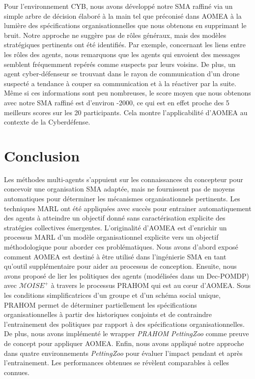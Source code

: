 Pour l'environnement CYB, nous avons développé notre SMA raffiné via un simple arbre de décision élaboré à la main tel que préconisé dans AOMEA à la lumière des spécifications organisationnelles que nous obtenons en supprimant le bruit. Notre approche ne suggère pas de rôles généraux, mais des modèles stratégiques pertinents ont été identifiés. Par exemple, concernant les liens entre les rôles des agents, nous remarquons que les agents qui envoient des messages semblent fréquemment repérés comme suspects par leurs voisins. De plus, un agent cyber-défenseur se trouvant dans le rayon de communication d'un drone suspecté a tendance à couper sa communication et à la réactiver par la suite. Même si ces informations sont peu nombreuses, le score moyen que nous obtenons avec notre SMA raffiné est d'environ -2000, ce qui est en effet proche des 5 meilleurs scores sur les 20 participants. Cela montre l'applicabilité d'AOMEA au contexte de la Cyberdéfense.

\section{Conclusion}

Les méthodes multi-agents s'appuient sur les connaissances du concepteur pour concevoir une organisation SMA adaptée, mais ne fournissent pas de moyens automatiques pour déterminer les mécanismes organisationnels pertinents.
Les techniques MARL ont été appliquées avec succès pour entrainer automatiquement des agents à atteindre un objectif donné sans caractérisation explicite des stratégies collectives émergentes.
L'originalité d'AOMEA est d'enrichir un processus MARL d'un modèle organisationnel explicite vers un objectif méthodologique pour aborder ces problématiques. Nous avons d'abord exposé comment AOMEA est destiné à être utilisé dans l'ingénierie SMA en tant qu'outil supplémentaire pour aider au processus de conception.
Ensuite, nous avons proposé de lier les politiques des agents (modélisées dans un Dec-POMDP) avec $\mathcal{M}OISE^+$ à travers le processus PRAHOM qui est au cœur d'AOMEA. Sous les conditions simplificatrices d'un groupe et d'un schéma social unique, PRAHOM permet de déterminer partiellement les spécifications organisationnelles à partir des historiques conjoints et de contraindre l'entrainement des politiques par rapport à des spécifications organisationnelles.
De plus, nous avons implémenté le wrapper \emph{PRAHOM PettingZoo} comme preuve de concept pour appliquer AOMEA.
Enfin, nous avons appliqué notre approche dans quatre environnements \emph{PettingZoo} pour évaluer l'impact pendant et après l'entrainement. Les performances obtenues se révèlent comparables à celles connues.

